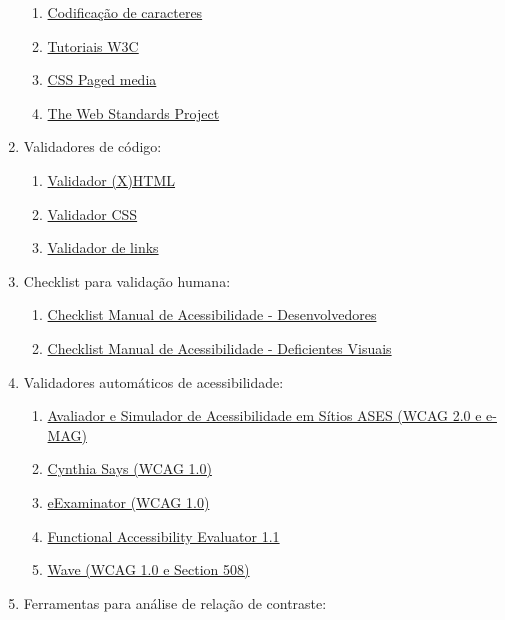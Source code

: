 \documentclass[
  12pt,
  openright,
  twoside,
  a4paper,
  english,
  french,
  spanish,
  brazil
]{abntex2}
\begin{document}
\begin{enumerate}
\begin{enumerate}
    \item \href{http://www.w3.org/International/O-charset.pt-br.php}{Codificação de caracteres}
    \item \href{http://www.w3.org/2002/03/tutorials}{Tutoriais W3C}
    \item \href{http://www.w3.org/TR/REC-CSS2/page.html}{CSS Paged media}
    \item \href{http://www.webstandards.org}{The Web Standards Project}
  \end{enumerate}
  \item Validadores de código:
  \begin{enumerate}
    \item \href{http://validator.w3.org}{Validador (X)HTML}
    \item \href{http://jigsaw.w3.org/css-validator}{Validador CSS}
    \item \href{http://validator.w3.org/checklink}{Validador de links}
  \end{enumerate}
  \item Checklist para validação humana:
  \begin{enumerate}
    \item \href{https://www.gov.br/governodigital/pt-br/acessibilidade-e-usuario/acessibilidade-digital/emag-checklist-acessibilidade-desenvolvedores.pdf}{Checklist Manual de Acessibilidade - Desenvolvedores}
    \item \href{https://www.gov.br/governodigital/pt-br/acessibilidade-e-usuario/acessibilidade-digital/emag-checklist-acessibilidade-dv.pdf}{Checklist Manual de Acessibilidade - Deficientes Visuais}
  \end{enumerate}
  \item Validadores automáticos de acessibilidade:
  \begin{enumerate}
    \item \href{https://asesweb.governoeletronico.gov.br}{Avaliador e Simulador de Acessibilidade em Sítios ASES (WCAG 2.0 e e-MAG)}
    \item \href{http://www.cynthiasays.com}{Cynthia Says (WCAG 1.0)}
    \item \href{http://www.acessibilidade.gov.pt/webax/examinator.php}{eExaminator (WCAG 1.0)}
    \item \href{http://fae.cita.uiuc.edu}{Functional Accessibility Evaluator 1.1}
    \item \href{http://wave.webaim.org}{Wave (WCAG 1.0 e Section 508)}
  \end{enumerate}
  \item Ferramentas para análise de relação de contraste:

\end{enumerate}
\end{document}
